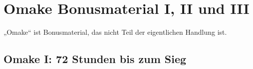 \chapter{Omake Bonusmaterial I, II und III\protect\footnotemark}

\begin{chapterOpeningAuthorNote}

„Omake“ ist Bonusmaterial, das nicht Teil der eigentlichen Handlung ist.
\end{chapterOpeningAuthorNote}




\section{Omake I: 72 Stunden bis zum Sieg}

